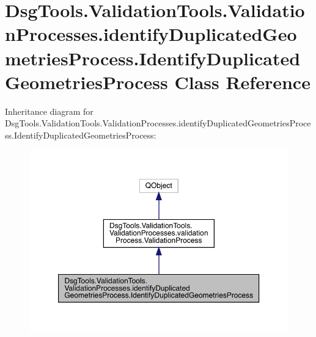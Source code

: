 \hypertarget{class_dsg_tools_1_1_validation_tools_1_1_validation_processes_1_1identify_duplicated_geometries_55f3ef122508ca76ef1215b3f842280d}{}\section{Dsg\+Tools.\+Validation\+Tools.\+Validation\+Processes.\+identify\+Duplicated\+Geometries\+Process.\+Identify\+Duplicated\+Geometries\+Process Class Reference}
\label{class_dsg_tools_1_1_validation_tools_1_1_validation_processes_1_1identify_duplicated_geometries_55f3ef122508ca76ef1215b3f842280d}


Inheritance diagram for Dsg\+Tools.\+Validation\+Tools.\+Validation\+Processes.\+identify\+Duplicated\+Geometries\+Process.\+Identify\+Duplicated\+Geometries\+Process\+:
\nopagebreak
\begin{figure}[H]
\begin{center}
\leavevmode
\includegraphics[width=350pt]{class_dsg_tools_1_1_validation_tools_1_1_validation_processes_1_1identify_duplicated_geometries_398a80096a365b1ddc7980d8f8cb2fcc}
\end{center}
\end{figure}


